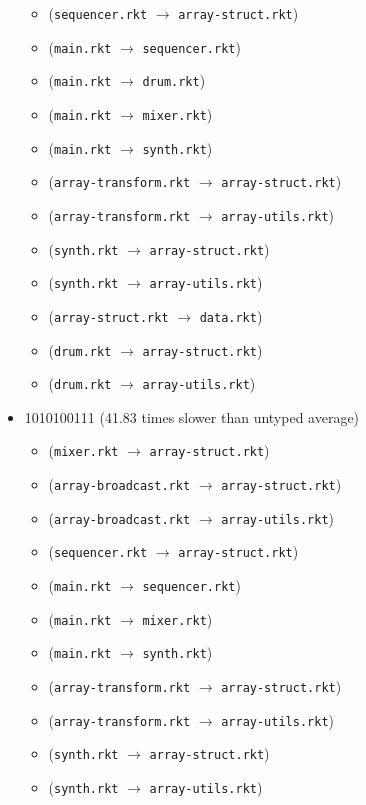 \documentclass{article}
\newcommand{\mono}[1]{\texttt{#1}}
\begin{document}
\begin{itemize}
\begin{itemize}
  \item (\mono{sequencer.rkt} $\rightarrow$ \mono{array-struct.rkt})
  \item (\mono{main.rkt} $\rightarrow$ \mono{sequencer.rkt})
  \item (\mono{main.rkt} $\rightarrow$ \mono{drum.rkt})
  \item (\mono{main.rkt} $\rightarrow$ \mono{mixer.rkt})
  \item (\mono{main.rkt} $\rightarrow$ \mono{synth.rkt})
  \item (\mono{array-transform.rkt} $\rightarrow$ \mono{array-struct.rkt})
  \item (\mono{array-transform.rkt} $\rightarrow$ \mono{array-utils.rkt})
  \item (\mono{synth.rkt} $\rightarrow$ \mono{array-struct.rkt})
  \item (\mono{synth.rkt} $\rightarrow$ \mono{array-utils.rkt})
  \item (\mono{array-struct.rkt} $\rightarrow$ \mono{data.rkt})
  \item (\mono{drum.rkt} $\rightarrow$ \mono{array-struct.rkt})
  \item (\mono{drum.rkt} $\rightarrow$ \mono{array-utils.rkt})
  \end{itemize}
\item 1010100111 (41.83 times slower than untyped average)
  \begin{itemize}
  \item (\mono{mixer.rkt} $\rightarrow$ \mono{array-struct.rkt})
  \item (\mono{array-broadcast.rkt} $\rightarrow$ \mono{array-struct.rkt})
  \item (\mono{array-broadcast.rkt} $\rightarrow$ \mono{array-utils.rkt})
  \item (\mono{sequencer.rkt} $\rightarrow$ \mono{array-struct.rkt})
  \item (\mono{main.rkt} $\rightarrow$ \mono{sequencer.rkt})
  \item (\mono{main.rkt} $\rightarrow$ \mono{mixer.rkt})
  \item (\mono{main.rkt} $\rightarrow$ \mono{synth.rkt})
  \item (\mono{array-transform.rkt} $\rightarrow$ \mono{array-struct.rkt})
  \item (\mono{array-transform.rkt} $\rightarrow$ \mono{array-utils.rkt})
  \item (\mono{synth.rkt} $\rightarrow$ \mono{array-struct.rkt})
  \item (\mono{synth.rkt} $\rightarrow$ \mono{array-utils.rkt})

\end{itemize}
\end{itemize}
\end{document}
